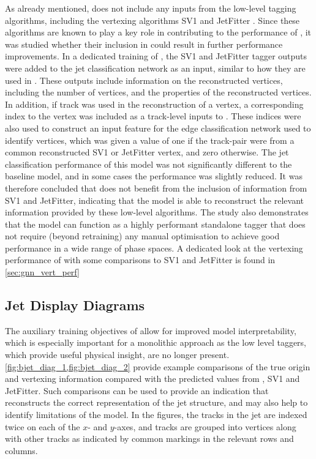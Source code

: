 As already mentioned, \GNN does not include any inputs from the low-level tagging algorithms, including the vertexing algorithms SV1 and JetFitter \cite{FTAG-2018-01}.
Since these algorithms are known to play a key role in contributing to the performance of \DLr, it was studied whether their inclusion in \GNN could result in further performance improvements.
In a dedicated training of \GNN, the SV1 and JetFitter tagger outputs were added to the \GNN jet classification network as an input, similar to how they are used in \DLr.
These outputs include information on the reconstructed vertices, including the number of vertices, and the properties of the reconstructed vertices.
In addition, if track was used in the reconstruction of a vertex, a corresponding index to the vertex was included as a track-level inputs to \GNN.
These indices were also used to construct an input feature for the edge classification network used to identify vertices, which was given a value of one if the track-pair were from a common reconstructed SV1 or JetFitter vertex, and zero otherwise.
The jet classification performance of this \GNN model was not significantly different to the baseline model, and in some cases the performance was slightly reduced.
It was therefore concluded that \GNN does not benefit from the inclusion of information from SV1 and JetFitter, indicating that the model is able to reconstruct the relevant information provided by these low-level algorithms.
The study also demonstrates that the model can function as a highly performant standalone tagger that does not require (beyond retraining) any manual optimisation to achieve good performance in a wide range of phase spaces.
A dedicated look at the vertexing performance of \GNN with some comparisons to SV1 and JetFitter is found in \cref{sec:gnn_vert_perf}




\subsection{Jet Display Diagrams}

The auxiliary training objectives of \GNN allow for improved model interpretability, which is especially important for a monolithic approach as the low level taggers, which provide useful physical insight, are no longer present.
\cref{fig:bjet_diag_1,fig:bjet_diag_2} provide example comparisons of the true origin and vertexing information compared with the predicted values from \GNN, SV1 and JetFitter.
Such comparisons can be used to provide an indication that \GNN reconstructs the correct representation of the jet structure, and may also help to identify limitations of the model.
In the figures, the tracks in the jet are indexed twice on each of the $x$- and $y$-axes, and tracks are  grouped into vertices along with other tracks as indicated by common markings in the relevant rows and columns.

